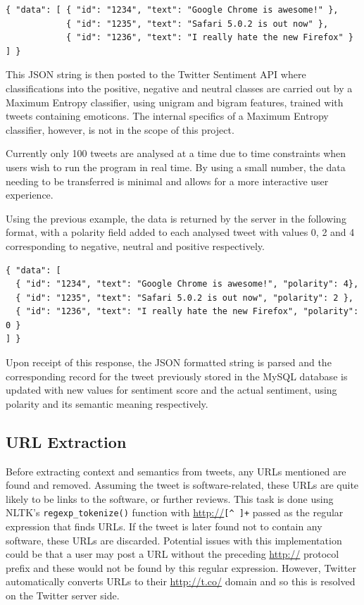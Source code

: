 \begin{verbatim}
{ "data": [ { "id": "1234", "text": "Google Chrome is awesome!" },
            { "id": "1235", "text": "Safari 5.0.2 is out now" },
            { "id": "1236", "text": "I really hate the new Firefox" } ] }
\end{verbatim}

This JSON string is then posted to the Twitter Sentiment API where classifications into the positive, negative and neutral classes are carried out by a Maximum Entropy classifier, using unigram and bigram features, trained with tweets containing emoticons. The internal specifics of a Maximum Entropy classifier, however, is not in the scope of this project.

Currently only 100 tweets are analysed at a time due to time constraints when users wish to run the program in real time. By using a small number, the data needing to be transferred is minimal and allows for a more interactive user experience.

Using the previous example, the data is returned by the server in the following format, with a polarity field added to each analysed tweet with values 0, 2 and 4 corresponding to negative, neutral and positive respectively.
\begin{verbatim}
{ "data": [ 
  { "id": "1234", "text": "Google Chrome is awesome!", "polarity": 4},
  { "id": "1235", "text": "Safari 5.0.2 is out now", "polarity": 2 },
  { "id": "1236", "text": "I really hate the new Firefox", "polarity": 0 } 
] }
\end{verbatim}

Upon receipt of this response, the JSON formatted string is parsed and the corresponding record for the tweet previously stored in the MySQL database is updated with new values for sentiment score and the actual sentiment, using polarity and its semantic meaning respectively.

\subsection{URL Extraction}
Before extracting context and semantics from tweets, any URLs mentioned are found and removed. Assuming the tweet is software-related, these URLs are quite likely to be links to the software, or further reviews. This task is done using NLTK's \texttt{regexp\_tokenize()} function with \url{http://}\verb/[^ ]+/ passed as the regular expression that finds URLs. If the tweet is later found not to contain any software, these URLs are discarded. Potential issues with this implementation could be that a user may post a URL without the preceding \url{http://} protocol prefix and these would not be found by this regular expression. However, Twitter automatically converts URLs to their \url{http://t.co/} domain and so this is resolved on the Twitter server side.

